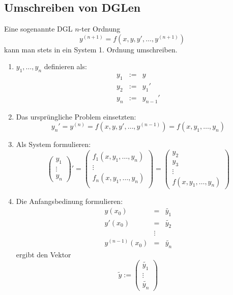 \subsection{Umschreiben von DGLen}
Eine sogenannte DGL $n$-ter Ordnung
\begin{equation*}
	y^{(n+1)} = f(x, y, y', \ldots, y^{(n+1)})
\end{equation*}
kann man stets in ein System 1. Ordnung umschreiben.

\begin{enumerate}
	\item $y_1, \ldots, y_n$ definieren als:
		\begin{eqnarray*}
			y_1 &:=& y\\
			y_2 &:=& y_1'\\
			y_n &:=& y_{n-1}'
		\end{eqnarray*}
	\item Das ursprüngliche Problem einsetzten:
		\begin{equation*}
			y_n' = y^{(n)} = f(x,y, y', \ldots, y^{(n-1)}) =
			f(x, y_1, \ldots, y_n)
		\end{equation*}
	\item Als System formulieren:
		\begin{equation*}
			{\begin{pmatrix}
				y_1 \\ \vdots \\ y_n
			\end{pmatrix}}'
			=
			\begin{pmatrix}
				f_1(x, y_1, \ldots, y_n) \\
				\vdots \\
				f_n(x, y_1, \ldots, y_n) \\
			\end{pmatrix}
			=
			\begin{pmatrix}
				y_2 \\ y_3 \\ \vdots \\ f(x, y_1, \ldots, y_n)
			\end{pmatrix}
		\end{equation*}
	\item Die Anfangsbedinung formulieren:
		\begin{eqnarray*}
			y(x_0) &=& \tilde{y_1} \\
			y'(x_0) &=& \tilde{y_2} \\
			& \vdots & \\
			y^{(n-1)}(x_0) &=& \tilde{y_n}
		\end{eqnarray*}
		ergibt den Vektor
		\begin{equation*}
			\tilde{y} := 
			\begin{pmatrix}
				\tilde{y_1} \\ \vdots \\ \tilde{y_n}
			\end{pmatrix}
		\end{equation*}
\end{enumerate}